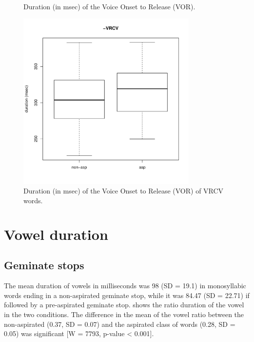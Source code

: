 \documentclass[11pt,a4paper,openany]{memoir}\usepackage[]{graphicx}\usepackage[]{color}
\newenvironment{knitrout}{}{} %
\begin{document}
\begin{figure}
\begin{subfigure}{.5\textwidth}
\begin{knitrout}
\end{knitrout}
\end{subfigure}
\caption{Duration (in msec) of the Voice Onset to Release (VOR).}
\label{f:vor}
\end{figure}

\begin{figure}
\centering
\begin{knitrout}
\color{fgcolor}
\includegraphics[width=0.8\textwidth]{img/di-rho-vor-1} 

\end{knitrout}
\caption{Duration (in msec) of the Voice Onset to Release (VOR) of VRCV words.}
\label{f:vor-rho}
\end{figure}


\section{Vowel duration}
\label{s:vow-dur}

\subsection{Geminate stops}


The mean duration of vowels in milliseconds was 98 (SD = 19.1) in monosyllabic words ending in a non-aspirated geminate stop, while it was 84.47 (SD = 22.71) if followed by a pre-aspirated geminate stop.
 shows the ratio duration of the vowel in the two conditions.
The difference in the mean of the vowel ratio between the non-aspirated (0.37, SD = 0.07) and the aspirated class of words (0.28, SD = 0.05) was significant [W = 7793, p-value < 0.001].
\end{document}

